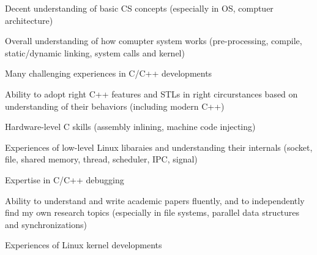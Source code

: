 

\begin{cventries}


\begin{small}
    {
      \begin{cvitems} %
        \item {Decent understanding of basic CS concepts (especially in OS, comptuer architecture)}
	\item {Overall understanding of how comupter system works (pre-processing, compile, static/dynamic linking, system calls and kernel)}
	\item {Many challenging experiences in C/C++ developments}
	\item {Ability to adopt right C++ features and  STLs in right circurstances based on understanding of their behaviors (including modern C++)}
	\item {Hardware-level C skills (assembly inlining, machine code injecting)} 
	\item {Experiences of low-level Linux libaraies and understanding their internals (socket, file, shared memory, thread, scheduler, IPC, signal)}
	\item {Expertise in C/C++ debugging}
	\item {Ability to understand and write academic papers fluently, and to independently find my own research topics (especially in file systems, parallel data structures and synchronizations)}
	\item {Experiences of Linux kernel developments}
      \end{cvitems}
    }
\end{small}

\end{cventries}

